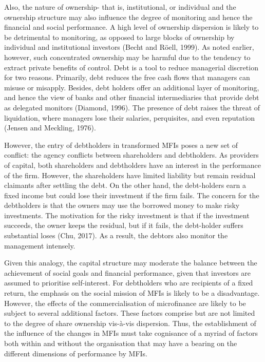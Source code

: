 \documentclass[a4paper, nobind]{templates/ociamthesis}
\begin{document}
Also, the nature of ownership- that is, institutional, or individual and the ownership structure may also influence the degree of monitoring and hence the financial and social performance. A high level of ownership dispersion is likely to be detrimental to monitoring, as opposed to large blocks of ownership by individual and institutional investors (Becht and Röell, 1999). As noted earlier, however, such concentrated ownership may be harmful due to the tendency to extract private benefits of control.
Debt is a tool to reduce managerial discretion for two reasons. Primarily, debt reduces the free cash flows that managers can misuse or misapply. Besides, debt holders offer an additional layer of monitoring, and hence the view of banks and other financial intermediaries that provide debt as delegated monitors (Diamond, 1996). The presence of debt raises the threat of liquidation, where managers lose their salaries, perquisites, and even reputation (Jensen and Meckling, 1976).

However, the entry of debtholders in transformed MFIs poses a new set of conflict: the agency conflicts between shareholders and debtholders. As providers of capital, both shareholders and debtholders have an interest in the performance of the firm. However, the shareholders have limited liability but remain residual claimants after settling the debt. On the other hand, the debt-holders earn a fixed income but could lose their investment if the firm fails. The concern for the debtholders is that the owners may use the borrowed money to make risky investments. The motivation for the risky investment is that if the investment succeeds, the owner keeps the residual, but if it fails, the debt-holder suffers substantial loses (Chu, 2017). As a result, the debtors also monitor the management intensely.

Given this analogy, the capital structure may moderate the balance between the achievement of social goals and financial performance, given that investors are assumed to prioritise self-interest. For debtholders who are recipients of a fixed return, the emphasis on the social mission of MFIs is likely to be a disadvantage. However, the effects of the commercialisation of microfinance are likely to be subject to several additional factors. These factors comprise but are not limited to the degree of share ownership vis-à-vis dispersion. Thus, the establishment of the influence of the changes in MFIs must take cognisance of a myriad of factors both within and without the organisation that may have a bearing on the different dimensions of performance by MFIs.
\end{document}

